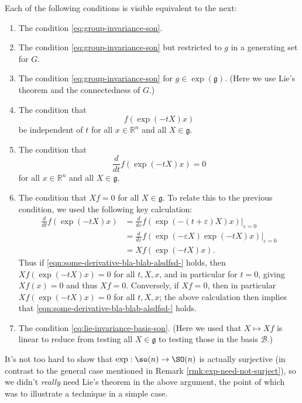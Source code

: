 \documentclass[reqno]{amsart} 
\def\eps{\varepsilon}
\begin{document}
Each of the following conditions is visible equivalent to the next:
\begin{enumerate}
\item The condition
  \eqref{eq:group-invariance-son}.
\item The condition
  \eqref{eq:group-invariance-son}
  but restricted to $g$ in a generating set for $G$.
\item
   The condition
   \eqref{eq:group-invariance-son}
   for $g \in \exp(\mathfrak{g})$.
   (Here we use Lie's theorem and the connectedness of $G$.)
 \item The condition that
   \begin{equation*}
     f(\exp(-t X) x)
   \end{equation*}
   be independent of $t$ for all $x \in \mathbb{R}^n$ and all $X
   \in \mathfrak{g}$.
 \item The condition that
   \begin{equation}\label{eqn:some-derivative-bla-blab-alsdfsd-}
     \frac{d}{d t} f(\exp(-t X) x) = 0
   \end{equation}
   for all $x \in \mathbb{R}^n$ and all $X
   \in \mathfrak{g}$.
 \item The condition
  that $X f = 0$ for all $X \in \mathfrak{g}$.
   To relate this to the previous condition,
   we used the following key calculation:
   \begin{align*}
     \frac{d}{d t} f(\exp(-t X) x)
     &= 
       \frac{d}{d \eps} f(\exp(-(t+\eps) X) x)|_{\eps=0}
       \\
     &= 
       \frac{d}{d \eps} f(\exp(- \eps X) \exp(-t X) x)|_{\eps=0}
       \\
     &= 
     X f(\exp(-t X) x).
   \end{align*}
   Thus if \eqref{eqn:some-derivative-bla-blab-alsdfsd-} holds,
   then $X f (\exp(-t X) x) = 0$ for all $t,X,x$,
   and in particular for $t = 0$,
   giving $X f(x) = 0$ and thus $X f = 0$.
   Conversely,
   if $X f = 0$,
   then in particular $X f(\exp(-t X) x) = 0$ for all $t,X,x$;
   the above calculation then implies that
   \eqref{eqn:some-derivative-bla-blab-alsdfsd-} holds.
\item The condition
  \eqref{eq:lie-invariance-basis-son}.
  (Here we used that $X \mapsto X f$ is linear to reduce from
  testing 
  all $X \in \mathfrak{g}$
  to testing those in the basis $\mathcal{B}$.)
\end{enumerate}
\begin{remark}
  It's not too hard to show that
  $\exp : \so(n) \rightarrow \SO(n)$ is actually surjective (in
  contrast to the general case mentioned in Remark
  \ref{rmk:exp-need-not-surject}), so we didn't \emph{really}
  need Lie's theorem in the above argument, the point of which
  was to illustrate a technique in a simple case.
\end{remark}
\end{document}
